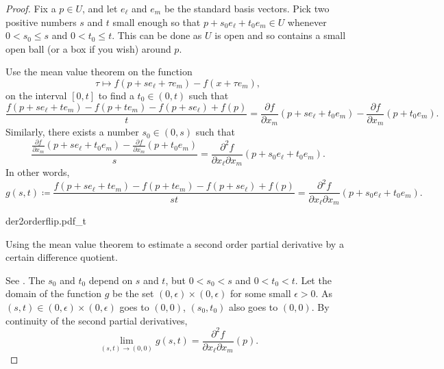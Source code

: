 \begin{proof}
Fix a $p \in U$, and let $e_{\ell}$ and $e_m$ be the standard basis vectors.
Pick two positive numbers $s$ and $t$ small enough so that
$p+s_0e_{\ell} +t_0e_m \in U$ whenever
$0 < s_0 \leq s$ and $0 < t_0 \leq t$.  This can be done as $U$ is open and so
contains a small open ball (or a box if you wish) around $p$.

Use the mean value theorem on the function
\begin{equation*}
\tau \mapsto f(p+se_{\ell} + \tau e_m)-f(x + \tau e_m) ,
\end{equation*}
on the interval $[0,t]$
to find a $t_0 \in (0,t)$
such that
\begin{equation*}
\frac{f(p+se_{\ell} + te_m)- f(p+t e_m) - f(p+s e_{\ell})+f(p)}{t}
=
\frac{\partial f}{\partial x_m}(p + s e_{\ell} + t_0 e_m)
-
\frac{\partial f}{\partial x_m}(p + t_0 e_m) .
\end{equation*}
Similarly, there exists a number $s_0 \in (0,s)$ such that
\begin{equation*}
\frac{\frac{\partial f}{\partial x_m}(p + s e_{\ell} + t_0 e_m)
-
\frac{\partial f}{\partial x_m}(p + t_0 e_m)}{s}
=
\frac{\partial^2 f}{\partial x_{\ell} \partial x_m}(p + s_0 e_{\ell} + t_0 e_m) .
\end{equation*}
In other words,
\begin{equation*}
g(s,t) \coloneqq
\frac{f(p+se_{\ell} + te_m)- f(p+t e_m) - f(p+s e_{\ell})+f(p)}{st}
=
\frac{\partial^2 f}{\partial x_{\ell} \partial x_m}(p + s_0 e_{\ell} + t_0 e_m) .
\end{equation*}

\begin{myfigureht}
{der2orderflip.pdf_t}
\caption{Using the mean value theorem to estimate
a second order partial derivative by
a certain difference quotient.\label{fig:der2orderflip}}
\end{myfigureht}

See .
The $s_0$ and $t_0$ depend on $s$ and $t$,
but $0 < s_0 < s$ and
$0 < t_0 < t$.
Let the domain of the function $g$ be the set $(0,\epsilon) \times
(0,\epsilon)$ for some small $\epsilon > 0$.
As $(s,t) \in (0,\epsilon) \times (0,\epsilon)$ goes to $(0,0)$,
$(s_0,t_0)$ also goes to $(0,0)$.
By continuity of the second partial derivatives,
\begin{equation*}
\lim_{(s,t) \to (0,0)} g(s,t) = 
\frac{\partial^2 f}{\partial x_{\ell} \partial x_m}(p) .
\end{equation*}


\end{proof}
